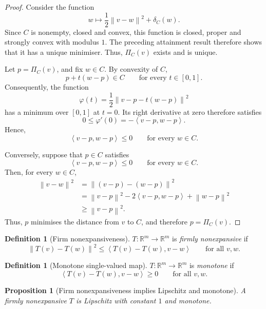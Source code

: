 \documentclass[a4paper,11pt]{book}
\theoremstyle{plain}
\newtheorem{proposition}[theorem]{Proposition}
\theoremstyle{definition}
\newtheorem{definition}[theorem]{Definition}
\theoremstyle{remark}
\numberwithin{equation}{chapter}
\numberwithin{algorithm}{chapter}
\newcommand{\R}{\mathbb{R}}
\newcommand{\proj}[2]{\Pi_{#2}\!\left(#1\right)}
\newcommand{\norm}[1]{\left\|#1\right\|}
\newcommand{\inner}[2]{\left\langle #1, #2 \right\rangle}
\begin{document}
	\begin{proof}
		Consider the function
		\[
		w\longmapsto
		\frac12\norm{v-w}^2+\delta_C(w).
		\]
		Since $C$ is nonempty, closed and convex, this function is closed, proper and
		strongly convex with modulus $1$. The preceding attainment result therefore
		shows that it has a unique minimiser. Thus, $\proj{v}{C}$ exists and is unique.
		
		Let $p=\proj{v}{C}$, and fix $w\in C$. By convexity of $C$,
		\[
		p+t(w-p)\in C
		\qquad\text{for every }t\in[0,1].
		\]
		Consequently, the function
		\[
		\varphi(t)
		=
		\frac12\norm{v-p-t(w-p)}^2
		\]
		has a minimum over $[0,1]$ at $t=0$. Its right derivative at zero therefore
		satisfies
		\[
		0\leq\varphi'(0)
		=
		-\inner{v-p}{w-p}.
		\]
		Hence,
		\[
		\inner{v-p}{w-p}\leq0
		\qquad\text{for every }w\in C.
		\]
		
		Conversely, suppose that $p\in C$ satisfies
		\[
		\inner{v-p}{w-p}\leq0
		\qquad\text{for every }w\in C.
		\]
		Then, for every $w\in C$,
		\[
		\begin{aligned}
			\norm{v-w}^2
			&=\norm{(v-p)-(w-p)}^2\\
			&=\norm{v-p}^2
			-2\inner{v-p}{w-p}
			+\norm{w-p}^2\\
			&\geq\norm{v-p}^2.
		\end{aligned}
		\]
		Thus, $p$ minimises the distance from $v$ to $C$, and therefore
		$p=\proj{v}{C}$.
	\end{proof}
	
	\begin{definition}[Firm nonexpansiveness]
		$T:\R^m\to\R^m$ is \emph{firmly nonexpansive} if
		\begin{equation}
			\norm{T(v)-T(w)}^2\leq\inner{T(v)-T(w)}{v-w}
			\qquad\text{for all }v,w .
		\end{equation}
	\end{definition}
	\begin{definition}[Monotone single-valued map]
		$T:\R^m\to\R^m$ is \emph{monotone} if
		\begin{equation}
			\inner{T(v)-T(w)}{v-w}\geq0
			\qquad\text{for all }v,w .
		\end{equation}
	\end{definition}
	
	\begin{proposition}[Firm nonexpansiveness implies Lipschitz and monotone]
		A firmly nonexpansive $T$ is Lipschitz with constant $1$ and monotone.
	\end{proposition}
	
\end{document}
